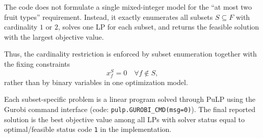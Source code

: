 The code does not formulate a single mixed-integer model for the ``at most two fruit types'' requirement. Instead, it exactly enumerates all subsets $S \subseteq F$ with cardinality $1$ or $2$, solves one LP for each subset, and returns the feasible solution with the largest objective value.

Thus, the cardinality restriction is enforced by subset enumeration together with the fixing constraints
\[
x_f^{S}=0 \quad \forall f \notin S,
\]
rather than by binary variables in one optimization model.

Each subset-specific problem is a linear program solved through PuLP using the Gurobi command interface (code: \texttt{pulp.GUROBI\_CMD(msg=0)}). The final reported solution is the best objective value among all LPs with solver status equal to optimal/feasible status code \texttt{1} in the implementation.
